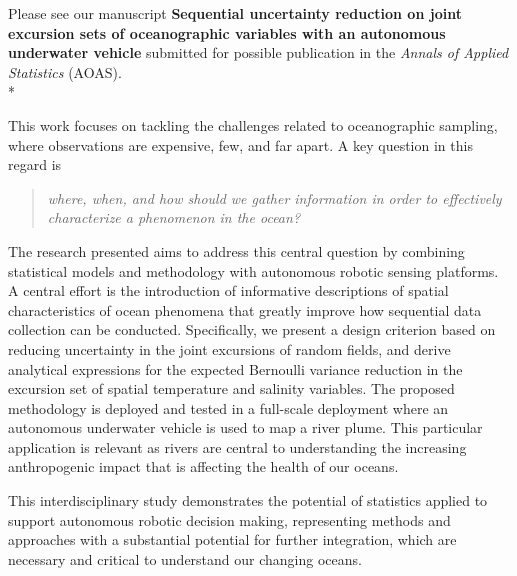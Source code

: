 \documentclass[10pt,stdletter]{newlfm}
\begin{document}
\begin{newlfm}

Please see our manuscript \textbf{Sequential uncertainty reduction on joint excursion sets of oceanographic variables with an autonomous underwater vehicle} submitted for possible publication in the \emph{Annals of Applied Statistics} (AOAS).\\*

This work focuses on tackling the challenges related to oceanographic sampling, where observations are expensive, few, and far apart. A key question in this regard is 

\begin{quote}
\textit{where, when, and how should we gather information in order to effectively characterize a phenomenon in the ocean?}  
\end{quote}{}

The research presented aims to address this central question by combining statistical models and methodology with autonomous robotic sensing platforms. A central effort is the introduction of informative descriptions of spatial characteristics of ocean phenomena that greatly improve how sequential data collection can be conducted. Specifically, we present a design criterion based on reducing uncertainty in the joint excursions of random fields, and derive analytical expressions for the expected Bernoulli variance reduction in the excursion set of spatial temperature and salinity variables. The proposed methodology is deployed and tested in a full-scale deployment where an autonomous underwater vehicle is used to map a river plume. This particular application is relevant as rivers are central to understanding the increasing anthropogenic impact that is affecting the health of our oceans. 

This interdisciplinary study demonstrates the potential of statistics applied to support autonomous robotic decision making, representing methods and approaches with a substantial potential for further integration, which are necessary and critical to understand our changing oceans. 


\vspace{1em}


\end{newlfm}
\end{document}
